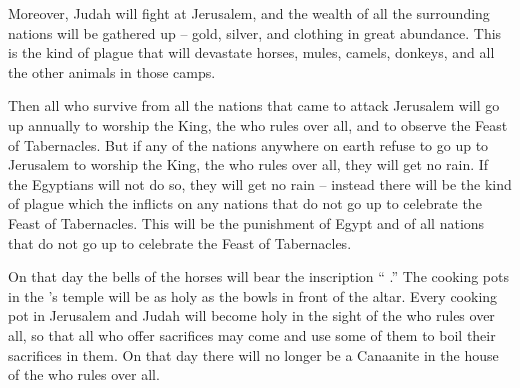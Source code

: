 {Moreover,
Judah
will fight
at Jerusalem,
and the wealth
of all
the surrounding
nations
will be gathered up –
gold,
silver,
and clothing
in great
abundance.
This is
the kind of plague
that will devastate horses,
mules,
camels,
donkeys,
and all
the other animals
in those
camps.
\par }{\PP {}Then
all
who survive
from all
the nations
that came
to attack
Jerusalem
will go up
annually
to worship
the King,
the {}
who rules over all,
and to observe
the Feast
of Tabernacles.
But if
any of the nations anywhere
on earth
refuse
to go up
to
Jerusalem
to worship
the King,
the {}
who rules over all,
they will
get no
rain.
If
the Egyptians
will not
do so, they will get
no rain – instead there will be the kind of plague which the
{} inflicts on any nations that do not go up to celebrate the Feast of Tabernacles.
This
will be
the punishment
of Egypt
and of all
nations
that
do not
go up
to celebrate
the Feast
of Tabernacles.
\par }{\PP {}On that day
the bells
of the horses
will bear the inscription “{}
{}.” The cooking pots
in the
{}’s
temple
will be
as holy as the bowls
in front
of the altar.
Every
cooking pot
in Jerusalem
and Judah
will become
holy
in the sight of the
{}
who rules over all,
so that all
who offer sacrifices
may come
and use
some of them
to boil
their sacrifices in them. On that day there will no
longer
be
a Canaanite
in the house
of the
{}
who rules over all.
\par }